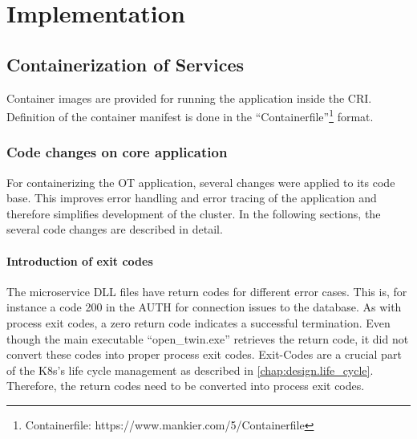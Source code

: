 \chapter{Implementation} %

\label{chap:implementation} %



\section{Containerization of Services}
Container images are provided for running the application inside the \ac{CRI}. Definition of the container manifest is done in the \enquote{Containerfile}\footnote{Containerfile: https://www.mankier.com/5/Containerfile} format.

\subsection{Code changes on core application}
For containerizing the \ac{OT} application, several changes were applied to its code base. This improves error handling and error tracing of the application and therefore simplifies development of the cluster. In the following sections, the several code changes are described in detail.

\subsubsection*{Introduction of exit codes}
The microservice \ac{DLL} files have return codes for different error cases. This is, for instance a code 200 in the \ac{AUTH} for connection issues to the database. As with process exit codes, a zero return code indicates a successful termination. Even though the main executable \enquote{open\_twin.exe} retrieves the return code, it did not convert these codes into proper process exit codes. 
Exit-Codes are a crucial part of the \ac{K8s}'s life cycle management as described in \autoref{chap:design.life_cycle}. Therefore, the return codes need to be converted into process exit codes.

